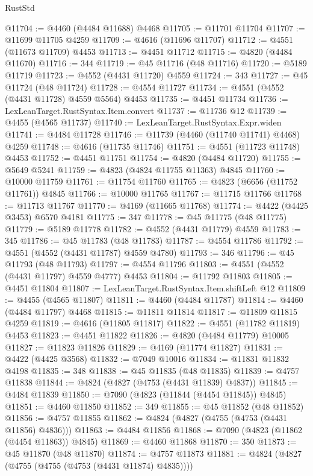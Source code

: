\begin{lexlean}{RustStd}
\begin{coremodule}
@11704 := @4460 (@4484 @11688) @4468
@11705 := @11701 @11704
@11707 := @11699 @11705 @4259
@11709 := @4616 (@11696 @11707)
@11712 := @4551 (@11673 @11709) @4453
@11713 := @4451 @11712
@11715 := @4820 (@4484 @11670)
@11716 := 344
@11719 := @45 @11716 (@48 @11716)
@11720 := @5189 @11719
@11723 := @4552 (@4431 @11720) @4559
@11724 := 343
@11727 := @45 @11724 (@48 @11724)
@11728 := @4554 @11727
@11734 := @4551 (@4552 (@4431 @11728) @4559 @5564) @4453
@11735 := @4451 @11734
@11736 := LexLeanTarget.RustSyntax.Item.convert
@11737 := @11736 @12
@11739 := @4455 (@4565 @11737)
@11740 := LexLeanTarget.RustSyntax.Expr.widen
@11741 := @4484 @11728
@11746 := @11739 (@4460 (@11740 @11741) @4468) @4259
@11748 := @4616 (@11735 @11746)
@11751 := @4551 (@11723 @11748) @4453
@11752 := @4451 @11751
@11754 := @4820 (@4484 @11720)
@11755 := @5649 @5241
@11759 := @4823 (@4824 @11755 @11363) @4845
@11760 := @10000 @11759
@11761 := @11754 @11760
@11765 := @4823 (@6656 (@11752 @11761)) @4845
@11766 := @10000 @11765
@11767 := @11715 @11766
@11768 := @11713 @11767
@11770 := @4169 (@11665 @11768)
@11774 := @4422 (@4425 @3453) @6570 @4181
@11775 := 347
@11778 := @45 @11775 (@48 @11775)
@11779 := @5189 @11778
@11782 := @4552 (@4431 @11779) @4559
@11783 := 345
@11786 := @45 @11783 (@48 @11783)
@11787 := @4554 @11786
@11792 := @4551 (@4552 (@4431 @11787) @4559 @4780)
@11793 := 346
@11796 := @45 @11793 (@48 @11793)
@11797 := @4554 @11796
@11803 := @4551 (@4552 (@4431 @11797) @4559 @4777) @4453
@11804 := @11792 @11803
@11805 := @4451 @11804
@11807 := LexLeanTarget.RustSyntax.Item.shiftLeft @12
@11809 := @4455 (@4565 @11807)
@11811 := @4460 (@4484 @11787)
@11814 := @4460 (@4484 @11797) @4468
@11815 := @11811 @11814
@11817 := @11809 @11815 @4259
@11819 := @4616 (@11805 @11817)
@11822 := @4551 (@11782 @11819) @4453
@11823 := @4451 @11822
@11826 := @4820 (@4484 @11779) @10005
@11827 := @11823 @11826
@11829 := @4169 (@11774 @11827)
@11831 := @4422 (@4425 @3568)
@11832 := @7049 @10016
@11834 := @11831 @11832 @4198
@11835 := 348
@11838 := @45 @11835 (@48 @11835)
@11839 := @4757 @11838
@11844 := @4824 (@4827 (@4753 (@4431 @11839) @4837))
@11845 := @4484 @11839
@11850 := @7090 (@4823 (@11844 (@4454 @11845)) @4845)
@11851 := @4460 @11850
@11852 := 349
@11855 := @45 @11852 (@48 @11852)
@11856 := @4757 @11855
@11862 := @4824 (@4827 (@4755 (@4753 (@4431 @11856) @4836)))
@11863 := @4484 @11856
@11868 := @7090 (@4823 (@11862 (@4454 @11863)) @4845)
@11869 := @4460 @11868
@11870 := 350
@11873 := @45 @11870 (@48 @11870)
@11874 := @4757 @11873
@11881 := @4824 (@4827 (@4755 (@4755 (@4753 (@4431 @11874) @4835))))

\end{coremodule}
\end{lexlean}
